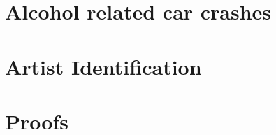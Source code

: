 \documentclass[a4paper]{report}
\theoremstyle{plain}
\begin{document}
\chapter{Alcohol related car crashes}
    
    

\chapter{Artist Identification}
    


\clearpage
\appendix
{}
\chapter{Proofs}

\end{document}
